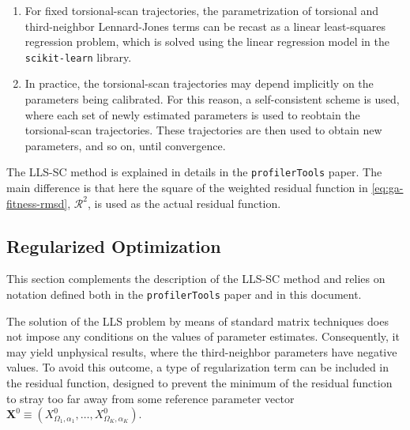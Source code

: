 \documentclass[10pt,a4paper,openany]{memoir}
\numberwithin{equation}{section}
\newcommand{\profilertools}[0]{\texttt{profilerTools}}
\begin{document}
\begin{enumerate}
  \item For fixed torsional-scan trajectories, the parametrization of
    torsional and third-neighbor Lennard-Jones terms can be recast as
    a linear least-squares regression problem, which is solved using
    the linear regression model in the \texttt{scikit-learn} library.
  \item In practice, the torsional-scan trajectories may depend
    implicitly on the parameters being calibrated. For this reason, a
    self-consistent scheme is used, where each set of newly estimated
    parameters is used to reobtain the torsional-scan trajectories.
    These trajectories are then used to obtain new parameters, and so
    on, until convergence.
\end{enumerate}

The LLS-SC method is explained in details in the \profilertools{}
paper\cite{PAPER}. The main difference is that here the square of
the weighted residual function in \autoref{eq:ga-fitness-rmsd},
$\mathcal{R}^{2}$, is used as the actual residual function.


\subsection{Regularized Optimization}
\label{sec:regularization}

This section complements the description of the LLS-SC method and
relies on notation defined both in the \profilertools{}
paper\cite{PAPER} and in this document.

The solution of the LLS problem by means of standard matrix techniques
does not impose any conditions on the values of parameter estimates.
%
Consequently, it may yield unphysical results, where the
third-neighbor parameters have negative values.
%
To avoid this outcome, a type of regularization term can be included
in the residual function, designed to prevent the minimum of the
residual function to stray too far away from some reference parameter
vector
$\mathbf{X}^0 \equiv (X^0_{\Omega_1,\alpha_1},\ldots,X^0_{\Omega_K,\alpha_K})$.
%
\end{document}
